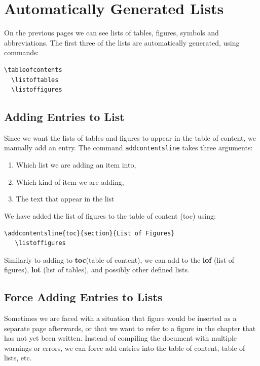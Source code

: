 \documentclass[a4paper,10pt]{report} %
\begin{document}
\section{Automatically Generated Lists}\label{sec:automatic}
On the previous pages we can see lists of tables, figures, symbols and abbreviations. The first three of the lists are automatically generated, using commands:

\begin{lstlisting}[language={[latex]tex},
  frame=single,
  basicstyle=\footnotesize\color{darkgray}, 
  keywordstyle=\bf\color{magenta},
  commentstyle=\color{ForestGreen},  %
  breaklines=true
  ]
  \tableofcontents
  \listoftables
  \listoffigures
\end{lstlisting}

\subsection{Adding Entries to List}
 Since we want the lists of tables and figures to appear in the table of content, we manually add an entry. The command \texttt{addcontentsline} takes three arguments:
 \begin{enumerate}[label=\arabic*)]
  \item Which list we are adding an item into,
  \item Which kind of item we are adding,
  \item The text that appear in the list
 \end{enumerate}

 We have added the list of figures to the table of content (toc) using: 
 \begin{lstlisting}[language={[latex]tex},
   frame=single,
   basicstyle=\footnotesize\color{darkgray}, 
   keywordstyle=\bf\color{magenta},
   commentstyle=\color{ForestGreen},  %
   breaklines=true
   ]
   \addcontentsline{toc}{section}{List of Figures} 
   \listoffigures
\end{lstlisting}

Similarly to adding to \textbf{toc}(table of content), we can add to the 
\textbf{lof} (list of figures), \textbf{lot} (list of tables), and possibly other defined lists.   

  \subsection{Force Adding Entries to Lists}
  Sometimes we are faced with a situation that figure would be inserted as a separate page afterwards, or that we want to refer to a figure in the chapter that has not yet been written. Instead of compiling the document with multiple warnings or errors, we can force add entries into the table of content, table of lists, etc.\\
  
\end{document}
